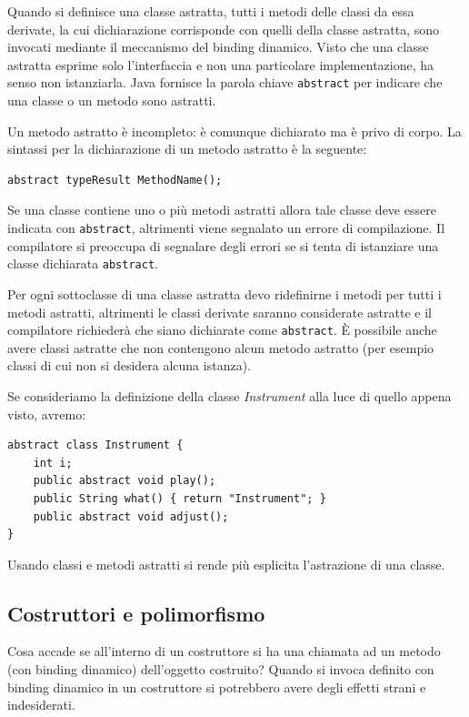 \documentclass[12pt]{report}
\begin{document}
Quando si definisce una classe astratta, tutti i metodi delle classi da essa derivate, la cui dichiarazione corrisponde con quelli della classe astratta, sono invocati mediante il meccanismo del binding dinamico. Visto che una classe astratta esprime solo l'interfaccia e non una particolare implementazione, ha senso non istanziarla. Java fornisce la parola chiave \texttt{abstract} per indicare che una classe o un metodo sono astratti.

Un metodo astratto è incompleto: è comunque dichiarato ma è privo di corpo. La sintassi per la dichiarazione di un metodo astratto è la seguente:
\begin{lstlisting}[style=javastyle]
abstract typeResult MethodName();
\end{lstlisting}
Se una classe contiene uno o più metodi astratti allora tale classe deve essere indicata con \texttt{abstract}, altrimenti viene segnalato un errore di compilazione. Il compilatore si preoccupa di segnalare degli errori se si tenta di istanziare una classe dichiarata \texttt{abstract}.

Per ogni sottoclasse di una classe astratta devo ridefinirne i metodi per tutti i metodi astratti, altrimenti le classi derivate saranno considerate astratte e il compilatore richiederà che siano dichiarate come \texttt{abstract}. È possibile anche avere classi astratte che non contengono alcun metodo astratto (per esempio classi di cui non si desidera alcuna istanza).
\begin{example}{}{}
Se consideriamo la definizione della classe \textit{Instrument} alla luce di quello appena visto, avremo:
\begin{lstlisting}[style=javastyle]
abstract class Instrument {
	int i;
	public abstract void play();
	public String what() { return "Instrument"; }
	public abstract void adjust();
}
\end{lstlisting}
\end{example}
\begin{note}{}{}
Usando classi e metodi astratti si rende più esplicita l'astrazione di una classe.
\end{note}
\subsection{Costruttori e polimorfismo}
Cosa accade se all'interno di un costruttore si ha una chiamata ad un metodo (con binding dinamico) dell'oggetto costruito? Quando si invoca definito con binding dinamico in un costruttore si potrebbero avere degli effetti strani e indesiderati.
\end{document}
